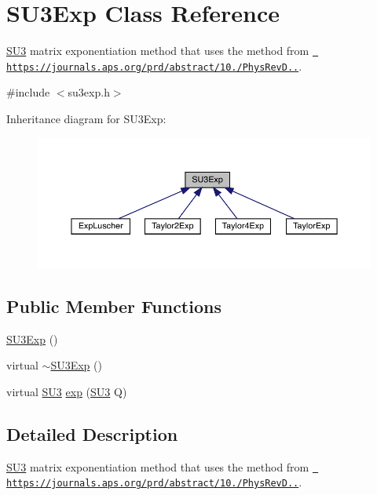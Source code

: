 \hypertarget{class_s_u3_exp}{}\section{S\+U3\+Exp Class Reference}
\label{class_s_u3_exp}


\mbox{\hyperlink{class_s_u3}{S\+U3}} matrix exponentiation method that uses the method from \href{https://journals.aps.org/prd/abstract/10.1103/PhysRevD.69.054501}{\texttt{ https\+://journals.\+aps.\+org/prd/abstract/10./\+Phys\+Rev\+D..}}.  




{\ttfamily \#include $<$su3exp.\+h$>$}



Inheritance diagram for S\+U3\+Exp\+:
\nopagebreak
\begin{figure}[H]
\begin{center}
\leavevmode
\includegraphics[width=350pt]{class_s_u3_exp__inherit__graph}
\end{center}
\end{figure}
\subsection*{Public Member Functions}
\begin{DoxyCompactItemize}
\item 
\mbox{\hyperlink{class_s_u3_exp_a98afc0784d4b7fd89951ffa7d1209de6}{S\+U3\+Exp}} ()
\item 
virtual \mbox{\hyperlink{class_s_u3_exp_a68dc1c6cf615a08251d9976ca779b6ce}{$\sim$\+S\+U3\+Exp}} ()
\item 
virtual \mbox{\hyperlink{class_s_u3}{S\+U3}} \mbox{\hyperlink{class_s_u3_exp_a9760c17b9c3a4b6d0a5cd4d88c6d577e}{exp}} (\mbox{\hyperlink{class_s_u3}{S\+U3}} Q)
\end{DoxyCompactItemize}


\subsection{Detailed Description}
\mbox{\hyperlink{class_s_u3}{S\+U3}} matrix exponentiation method that uses the method from \href{https://journals.aps.org/prd/abstract/10.1103/PhysRevD.69.054501}{\texttt{ https\+://journals.\+aps.\+org/prd/abstract/10./\+Phys\+Rev\+D..}}. 

